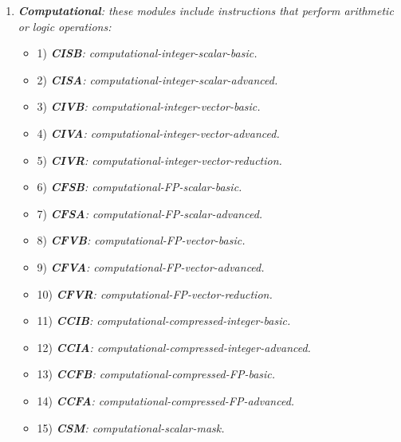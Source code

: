     \begin{enumerate}

        \item \textit{\textbf{Computational}: these modules include instructions that perform arithmetic or logic operations:}

            \begin{itemize}

                \item 1) \textit{\textbf{CISB}: computational-integer-scalar-basic.}
                \item 2) \textit{\textbf{CISA}: computational-integer-scalar-advanced.}

                \item 3) \textit{\textbf{CIVB}: computational-integer-vector-basic.}
                \item 4) \textit{\textbf{CIVA}: computational-integer-vector-advanced.}
                \item 5) \textit{\textbf{CIVR}: computational-integer-vector-reduction.}

                \item 6) \textit{\textbf{CFSB}: computational-FP-scalar-basic.}
                \item 7) \textit{\textbf{CFSA}: computational-FP-scalar-advanced.}

                \item 8) \textit{\textbf{CFVB}: computational-FP-vector-basic.}
                \item 9) \textit{\textbf{CFVA}: computational-FP-vector-advanced.}
                \item 10) \textit{\textbf{CFVR}: computational-FP-vector-reduction.}

                \item 11) \textit{\textbf{CCIB}: computational-compressed-integer-basic.}
                \item 12) \textit{\textbf{CCIA}: computational-compressed-integer-advanced.}

                \item 13) \textit{\textbf{CCFB}: computational-compressed-FP-basic.}
                \item 14) \textit{\textbf{CCFA}: computational-compressed-FP-advanced.}

                \item 15) \textit{\textbf{CSM}: computational-scalar-mask.}

            \end{itemize}


\end{enumerate}
